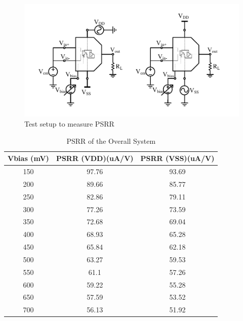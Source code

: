\begin{figure} [H]
\centering
\includegraphics[scale=1]{Figures/Test_Benches/Overall/PSRR.pdf}
\caption{Test setup to measure PSRR}
\end{figure}

\begin{table} [H]
\centering
\begin{tabular}{@{}ccc@{}}
\toprule
Vbias (mV)			& PSRR (VDD)(uA/V)			& PSRR (VSS)(uA/V)	 \\ \midrule
150					& 97.76	 					& 93.69					 \\
200					& 89.66 					& 85.77					 \\
250					& 82.86 					& 79.11					 \\
300					& 77.26 					& 73.59					 \\
350					& 72.68						& 69.04					 \\
400					& 68.93						& 65.28					 \\
450					& 65.84 					& 62.18					 \\
500					& 63.27						& 59.53					 \\
550					& 61.1	 					& 57.26					 \\
600					& 59.22 					& 55.28					 \\
650					& 57.59 					& 53.52					 \\
700 				& 56.13 					& 51.92					 \\
\bottomrule
\end{tabular}
\caption{PSRR of the Overall System}
\end{table}

